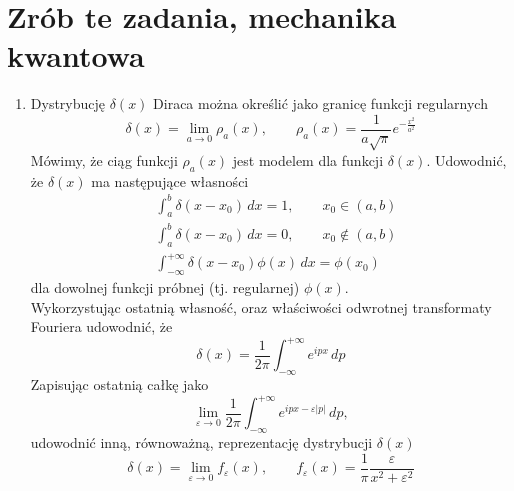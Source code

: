 \documentclass[a4paper,11pt]{article}
\begin{document}
\section{Zrób te zadania, mechanika kwantowa}




\begin{enumerate}
  \item Dystrybucję $\delta( x )$ Diraca można określić jako granicę funkcji
  regularnych
  \begin{equation}
    \label{eq:1}
    \delta( x ) = \lim_{ a \to 0 } \rho_{ a }( x ), \qquad
    \rho_{ a }( x ) = \frac{ 1 }{ a \sqrt{ \pi } } e^{ -\frac{ x^{ 2 } }{ a^{ 2 } } }
  \end{equation}
  Mówimy, że ciąg funkcji $\rho_{ a }( x )$ jest modelem dla funkcji
  $\delta( x )$. Udowodnić, że $\delta( x )$ ma następujące własności
  \begin{align}
    &\int_{ a }^{ b } \delta( x - x_{ 0 } ) \, dx = 1, \qquad
      x_{ 0 } \in ( a, b ) \\
    &\int_{ a }^{ b } \delta( x - x_{ 0 } ) \, dx = 0, \qquad
      x_{ 0 } \notin ( a, b ) \\
    &\int_{ -\infty }^{ +\infty } \delta( x - x_{ 0 } ) \phi( x ) \, dx = \phi( x_{ 0 } )
  \end{align}
  dla dowolnej funkcji próbnej (tj. regularnej) $\phi( x )$. \\
  Wykorzystując ostatnią własność, oraz właściwości odwrotnej
  transformaty Fouriera udowodnić, że
  \begin{equation}
    \label{eq:2}
    \delta( x ) = \frac{ 1 }{ 2\pi } \int_{ -\infty }^{ +\infty } e^{ i p x } \, dp
  \end{equation}
  Zapisując ostatnią całkę jako
  \begin{equation}
    \label{eq:3}
    \lim_{ \varepsilon \to 0 } \frac{ 1 }{ 2\pi } \int_{ -\infty }^{ +\infty } e^{ ipx - \varepsilon | p | } \, dp,
  \end{equation}
  udowodnić inną, równoważną, reprezentację dystrybucji $\delta( x )$
  \begin{equation}
    \label{eq:4}
    \delta( x ) = \lim_{ \varepsilon \to 0 } f_{ \varepsilon }( x ), \qquad
    f_{ \varepsilon }( x ) = \frac{ 1 }{ \pi } \frac{ \varepsilon }{ x^{ 2 } + \varepsilon^{ 2 } }
  \end{equation}


\end{enumerate}
\end{document}
